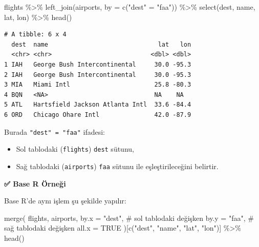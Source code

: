\documentclass[
  letterpaper,
  DIV=11,
  numbers=noendperiod]{scrreprt}
\newenvironment{Shaded}{\begin{snugshade}}{\end{snugshade}}
\newcommand{\AttributeTok}[1]{\textcolor[rgb]{0.40,0.45,0.13}{#1}}
\newcommand{\CommentTok}[1]{\textcolor[rgb]{0.37,0.37,0.37}{#1}}
\newcommand{\ConstantTok}[1]{\textcolor[rgb]{0.56,0.35,0.01}{#1}}
\newcommand{\FunctionTok}[1]{\textcolor[rgb]{0.28,0.35,0.67}{#1}}
\newcommand{\NormalTok}[1]{\textcolor[rgb]{0.00,0.23,0.31}{#1}}
\newcommand{\OtherTok}[1]{\textcolor[rgb]{0.00,0.23,0.31}{#1}}
\newcommand{\SpecialCharTok}[1]{\textcolor[rgb]{0.37,0.37,0.37}{#1}}
\newcommand{\StringTok}[1]{\textcolor[rgb]{0.13,0.47,0.30}{#1}}
\begin{document}
\begin{Shaded}
\begin{Highlighting}[]
\NormalTok{flights }\SpecialCharTok{\%\textgreater{}\%}
  \FunctionTok{left\_join}\NormalTok{(airports, }\AttributeTok{by =} \FunctionTok{c}\NormalTok{(}\StringTok{"dest"} \OtherTok{=} \StringTok{"faa"}\NormalTok{)) }\SpecialCharTok{\%\textgreater{}\%}
  \FunctionTok{select}\NormalTok{(dest, name, lat, lon) }\SpecialCharTok{\%\textgreater{}\%}
  \FunctionTok{head}\NormalTok{()}
\end{Highlighting}
\end{Shaded}

\begin{verbatim}
# A tibble: 6 x 4
  dest  name                              lat   lon
  <chr> <chr>                           <dbl> <dbl>
1 IAH   George Bush Intercontinental     30.0 -95.3
2 IAH   George Bush Intercontinental     30.0 -95.3
3 MIA   Miami Intl                       25.8 -80.3
4 BQN   <NA>                             NA    NA  
5 ATL   Hartsfield Jackson Atlanta Intl  33.6 -84.4
6 ORD   Chicago Ohare Intl               42.0 -87.9
\end{verbatim}

Burada \texttt{"dest"\ =\ "faa"} ifadesi:

\begin{itemize}
\item
  Sol tablodaki (\texttt{flights}) \texttt{dest} sütunu,
\item
  Sağ tablodaki (\texttt{airports}) \texttt{faa} sütunu ile
  eşleştirileceğini belirtir.
\end{itemize}

\textbf{✅ Base R Örneği}

Base R'de aynı işlem şu şekilde yapılır:

\begin{Shaded}
\begin{Highlighting}[]
\FunctionTok{merge}\NormalTok{(}
\NormalTok{flights,}
\NormalTok{airports,}
\AttributeTok{by.x =} \StringTok{"dest"}\NormalTok{,  }\CommentTok{\# sol tablodaki değişken}
\AttributeTok{by.y =} \StringTok{"faa"}\NormalTok{,   }\CommentTok{\# sağ tablodaki değişken}
\AttributeTok{all.x =} \ConstantTok{TRUE}
\NormalTok{)[}\FunctionTok{c}\NormalTok{(}\StringTok{"dest"}\NormalTok{, }\StringTok{"name"}\NormalTok{, }\StringTok{"lat"}\NormalTok{, }\StringTok{"lon"}\NormalTok{)] }\SpecialCharTok{\%\textgreater{}\%} \FunctionTok{head}\NormalTok{()}
\end{Highlighting}
\end{Shaded}
\end{document}
